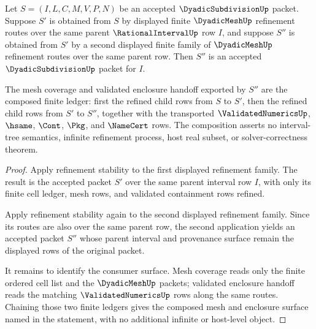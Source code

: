 \begin{theorem}
\label{thm:dyadic-subdivision-refinement-composition}
Let $S=(I,L,C,M,V,P,N)$ be an accepted $\DyadicSubdivisionUp$ packet. Suppose $S'$ is obtained from $S$ by displayed finite $\DyadicMeshUp$ refinement routes over the same parent $\RationalIntervalUp$ row $I$, and suppose $S''$ is obtained from $S'$ by a second displayed finite family of $\DyadicMeshUp$ refinement routes over the same parent row. Then $S''$ is an accepted $\DyadicSubdivisionUp$ packet for $I$.

The mesh coverage and validated enclosure handoff exported by $S''$ are the composed finite ledger: first the refined child rows from $S$ to $S'$, then the refined child rows from $S'$ to $S''$, together with the transported $\ValidatedNumericsUp$, $\hsame$, $\Cont$, $\Pkg$, and $\NameCert$ rows. The composition asserts no interval-tree semantics, infinite refinement process, host real subset, or solver-correctness theorem.
\end{theorem}
\begin{proof}
Apply refinement stability to the first displayed refinement family. The result is the accepted packet $S'$ over the same parent interval row $I$, with only its finite cell ledger, mesh rows, and validated containment rows refined.

Apply refinement stability again to the second displayed refinement family. Since its routes are also over the same parent row, the second application yields an accepted packet $S''$ whose parent interval and provenance surface remain the displayed rows of the original packet.

It remains to identify the consumer surface. Mesh coverage reads only the finite ordered cell list and the $\DyadicMeshUp$ packets; validated enclosure handoff reads the matching $\ValidatedNumericsUp$ rows along the same routes. Chaining those two finite ledgers gives the composed mesh and enclosure surface named in the statement, with no additional infinite or host-level object.
\end{proof}

